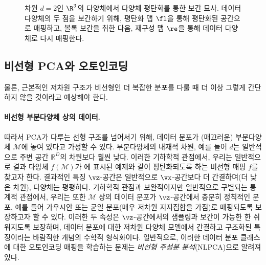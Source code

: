 \documentclass[../../book-main_ko.tex]{subfiles}
\begin{document}
\begin{figure}
  \caption{차원 $d = 2$인 $\R^{3}$의 다양체에서 다양체 평탄화를 통한 보간 묘사. 데이터 다양체의 두 점을 보간하기 위해, 평탄화 맵 $\fl$을 통해 평탄화된 공간으로 매핑하고, 볼록 보간을 취한 다음, 재구성 맵 $\re$을 통해 데이터 다양체로 다시 매핑한다.}
  \label{fig:idealized_interpolation}
\end{figure}

\subsection{비선형 PCA와 오토인코딩}\label{sub:nonlinear-pca}\label{sec:NLPCA}
물론, 근본적인 저차원 구조가 비선형인 더 복잡한 분포를 다룰 때 더 이상 그렇게 간단하지 않을 것이라고 예상해야 한다.

\paragraph{비선형 부분다양체 상의 데이터.} 따라서 PCA가 다루는 선형 구조를 넘어서기 위해, 데이터 분포가 (매끄러운) 부분다양체 $\mathcal{M}$에 놓여 있다고 가정할 수 있다. 부분다양체의 내재적 차원, 예를 들어 $d$는 일반적으로 주변 공간 $\mathbb{R}^D$의 차원보다 훨씬 낮다. 이러한 기하학적 관점에서, 우리는 일반적으로 결과 다양체 $f(\mathcal{M})$가 에 표시된 예제와 같이 평탄화되도록 하는 비선형 매핑 $f$를 찾고자 한다. 결과적인 특징 $\vz$-공간은 일반적으로 $\vx$-공간보다 더 간결하며(더 낮은 차원), 다양체는 평평하다.
기하학적 관점과 보완적이지만 일반적으로 구별되는 통계적 관점에서, 우리는 또한 $\mathcal{M}$ 상의 데이터 분포가 $\vz$-공간에서 충분히 정칙적인 분포, 예를 들어 가우시안 또는 균일 분포(매우 저차원 지지집합을 가짐)로 매핑되도록 보장하고자 할 수 있다. 이러한 두 속성은 $\vz$-공간에서의 샘플링과 보간이 가능한 한 쉬워지도록 보장하며, 데이터 분포에 대한 저차원 다양체 모델에서 간결하고 구조화된 특징이라는 바람직한 개념의 수학적 형식화이다.
일반적으로, 이러한 데이터 분포 클래스에 대한 오토인코딩 매핑을 학습하는 문제는 {\em 비선형 주성분 분석}(NLPCA)으로 알려져 있다.
\end{document}
